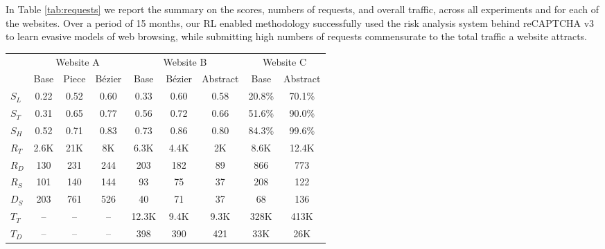 In Table \ref{tab:requests} we report the summary on the scores, numbers of requests, and overall traffic, across all experiments and for each of the websites.
Over a period of 15 months, our \gls{RL} enabled methodology successfully used the risk analysis system behind reCAPTCHA v3 to learn evasive models of web browsing, while submitting high numbers of requests commensurate to the total traffic a website attracts.

\begin{table*}
\centering
   \begin{tabular}{lccc|ccc|cc}
    \toprule
    &
      \multicolumn{3}{c}{Website A} &
      \multicolumn{3}{c}{Website B} &
      \multicolumn{2}{c}{Website C}\\
      & \small {Base} & \small {Piece} & \small {Bézier} & \small {Base} & \small {Bézier} & \small {Abstract} & \small {Base} & \small {Abstract}\\
      \toprule
    $S_L$ & 0.22 & 0.52 & 0.60 & 0.33 & 0.60 & 0.58 & 20.8\% & 70.1\%\\
    $S_T$ & 0.31 & 0.65 & 0.77 & 0.56 & 0.72 & 0.66 & 51.6\% & 90.0\% \\
    $S_H$ & 0.52 & 0.71 & 0.83 & 0.73 & 0.86 & 0.80 & 84.3\% & 99.6\% \\
    \midrule
    $R_T$ & 2.6K & 21K & 8K & 6.3K & 4.4K & 2K & 8.6K & 12.4K\\
    $R_D$ & 130 & 231 & 244 & 203 & 182 & 89 & 866 & 773 \\
    $R_S$ & 101 & 140 & 144 & 93 & 75 & 37 & 208 & 122\\
    $D_S$ & 203 & 761 & 526 & 40 & 71 & 37 & 68 & 136\\
    \midrule
    $T_T$ & -- & -- & -- & 12.3K & 9.4K & 9.3K & 328K & 413K \\
    $T_D$ & -- & -- & -- & 398 & 390 & 421 & 33K & 26K\\
    \bottomrule
  \end{tabular}
  \caption{Requests per website and agent. $S_L$, $S_T$, $S_H$ are the average score for low starting, total, and high starting sessions respectively. For Website C, $S_L$, $S_T$, $S_H$ denote the evasion rate instead. $R_T$ is the total amount of requests, $R_D$ are the average requests per day, $R_S$ are the average requests per session, $D_S$ is the average session duration in minutes, $T_T$ and $T_D$ are the total and daily amount of traffic during the experiments.}
  \label{tab:requests}
\end{table*}

